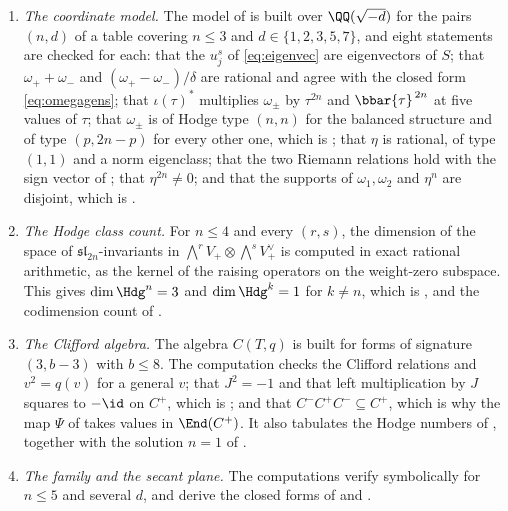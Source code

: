 \begin{enumerate}[label=\textup{(\Roman*)},leftmargin=*]
\item \emph{The coordinate model.} The model of  is built
  over $\QQ(\sqrt{-d})$ for the pairs $(n,d)$ of a table covering $n\le3$ and
  $d\in\{1,2,3,5,7\}$, and eight statements are checked for each: that the
  $u^{s}_{j}$ of \eqref{eq:eigenvec} are eigenvectors of $S$; that $\omega_{+}+\omega_{-}$ and
  $(\omega_{+}-\omega_{-})/\delta$ are rational and agree with the closed form
  \eqref{eq:omegagens}; that $\iota(\tau)^{*}$ multiplies $\omega_{\pm}$ by
  $\tau^{2n}$ and $\bbar{\tau}^{\,2n}$ at five values of $\tau$; that
  $\omega_{\pm}$ is of Hodge type $(n,n)$ for the balanced structure and of
  type $(p,2n-p)$ for every other one, which is ;
  that $\eta$ is rational, of type $(1,1)$ and a norm eigenclass; that the two
  Riemann relations hold with the sign vector of ; that
  $\eta^{2n}\ne0$; and that the supports of $\omega_{1},\omega_{2}$ and
  $\eta^{n}$ are disjoint, which is .

\item \emph{The Hodge class count.} For $n\le4$ and every $(r,s)$, the
  dimension of the space of $\mathfrak{sl}_{2n}$-invariants in
  $\bigwedge^{r}V_{+}\otimes\bigwedge^{s}V_{+}^{\vee}$ is computed in exact
  rational arithmetic, as the kernel of the raising operators on the
  weight-zero subspace. This gives $\dim\Hdg^{n}=3$ and $\dim\Hdg^{k}=1$ for
  $k\ne n$, which is , and the codimension count of
  .

\item \emph{The Clifford algebra.} The algebra $C(T,q)$ is built for forms
  of signature $(3,b-3)$ with $b\le8$. The computation checks the Clifford
  relations and $v^{2}=q(v)$ for a general $v$; that $J^{2}=-1$ and that
  left multiplication by $J$ squares to $-\id$ on $C^{+}$, which is
  ; and that $C^{-}C^{+}C^{-}\subseteq C^{+}$, which is why
  the map $\Psi$ of  takes values in $\End(C^{+})$. It
  also tabulates the Hodge numbers of , together with the
  solution $n=1$ of .

\item \emph{The family and the secant plane.} The computations verify
   symbolically for $n\le5$ and several $d$, and
  derive the closed forms of  and
  .


\end{enumerate}
